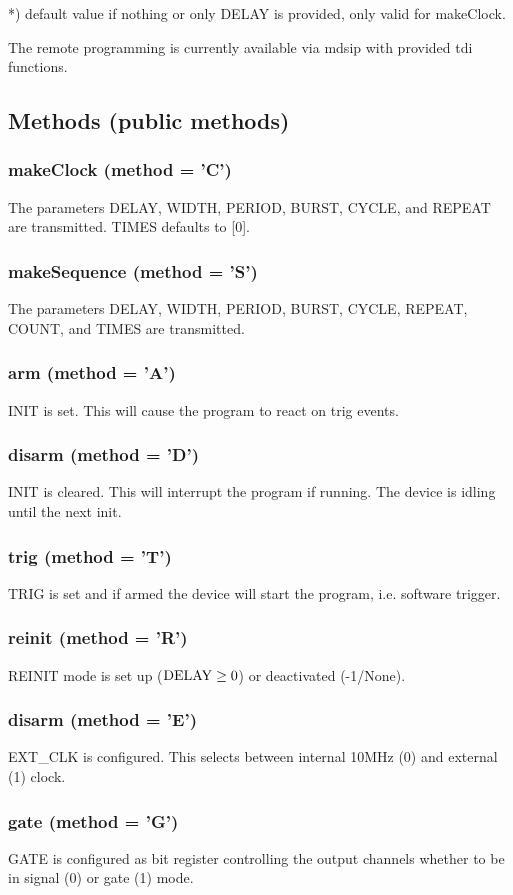 \documentclass{article}
\begin{document}
*) default value if nothing or only DELAY is provided, only valid for makeClock.

The remote programming is currently available via mdsip with provided tdi functions.

\subsection*{Methods (public methods)}
\subsubsection*{makeClock (method = 'C')}
The parameters DELAY, WIDTH, PERIOD, BURST, CYCLE, and REPEAT are transmitted. TIMES defaults to [0].
\subsubsection*{makeSequence (method = 'S')}
The parameters DELAY, WIDTH, PERIOD, BURST, CYCLE, REPEAT, COUNT, and TIMES are transmitted.
\subsubsection*{arm (method = 'A')}
INIT is set. This will cause the program to react on trig events.
\subsubsection*{disarm (method = 'D')}
INIT is cleared. This will interrupt the program if running. The device is idling until the next init.
\subsubsection*{trig (method = 'T')}
TRIG is set and if armed the device will start the program, i.e. software trigger.
\subsubsection*{reinit (method = 'R')}
REINIT mode is set up ($\rm{DELAY}\geq0$) or deactivated (-1/None).
\subsubsection*{disarm (method = 'E')}
EXT\_CLK is configured. This selects between internal 10MHz (0) and external (1) clock.
\subsubsection*{gate (method = 'G')}
GATE is configured as bit register controlling the output channels whether to be in signal (0) or gate (1) mode.
\end{document}
